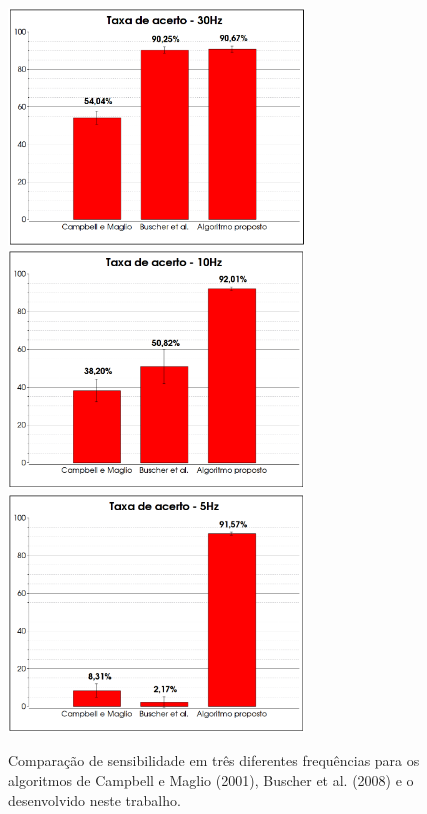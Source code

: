 \documentclass[12pt]{article}
\begin{document}
		\begin{figure}[!ht]
			\centering
			\includegraphics[width=7.85cm]{imgs/Graph1.png}
			\includegraphics[width=7.85cm]{imgs/Graph2.png}
			\includegraphics[width=7.85cm]{imgs/Graph3.png}
			\caption{\footnotesize {Comparação de sensibilidade em três diferentes frequências para os algoritmos de Campbell e Maglio (2001), Buscher et al. (2008) e o desenvolvido neste trabalho.}}
			\label{fig:sensibilidade}
			\vspace{5mm}
		\end{figure}
		
\end{document}
